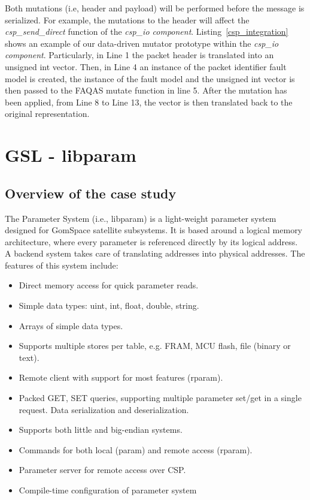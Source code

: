 Both mutations (i.e, header and payload) will be performed before the message is serialized. 
For example, the mutations to the header will affect the \emph{csp\_send\_direct} function of the \emph{csp\_io component}. 
Listing~\ref{csp_integration} shows an example of our data-driven mutator prototype within the \emph{csp\_io component}. 
Particularly, in Line 1 the packet header is translated into an unsigned int vector. 
Then, in Line 4 an instance of the packet identifier fault model is created, 
the instance of the fault model and the unsigned int vector is then passed to the FAQAS mutate function in line 5.
After the mutation has been applied, from Line 8 to Line 13, the vector is then translated back to the original representation.
 


\section{GSL - libparam}
\label{sec:caseStudies:GSL:libparam}

\subsection{Overview of the case study}

The Parameter System (i.e., libparam) is a light-weight parameter system designed for GomSpace satellite subsystems. It is based around a logical memory architecture, where every parameter is referenced directly by its logical address. A backend system takes care of translating addresses into physical addresses.
The features of this system include:
\begin{itemize}
\item Direct memory access for quick parameter reads.
\item Simple data types: uint, int, float, double, string.
\item Arrays of simple data types.
\item Supports multiple stores per table, e.g. FRAM, MCU flash, file (binary or text).
\item Remote client with support for most features (rparam).
\item Packed GET, SET queries, supporting multiple parameter set/get in a single request. Data serialization and deserialization.
\item Supports both little and big-endian systems.
\item Commands for both local (param) and remote access (rparam).
\item Parameter server for remote access over CSP.
\item Compile-time configuration of parameter system
\end{itemize}

